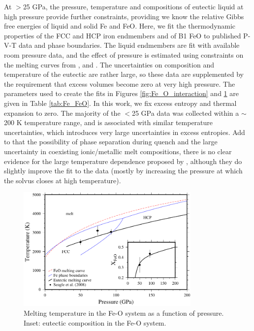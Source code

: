 \documentclass[review]{elsarticle}
\begin{document}
At $>$25 GPa, the pressure, temperature and compositions of eutectic liquid at high pressure \citep{SHCPW2008} provide further constraints, providing we know the relative Gibbs free energies of liquid and solid Fe and FeO. Here, we fit the thermodynamic properties of the FCC and HCP iron endmembers and of B1 FeO to published P-V-T data and phase boundaries. The liquid endmembers are fit with available room pressure data, and the effect of pressure is estimated using constraints on the melting curves from \cite{ADMLM2013}, \cite{SHCPW2008} and \cite{OTHOH2011}. The uncertainties on composition and temperature of the eutectic are rather large, so these data are supplemented by the requirement that excess volumes become zero at very high pressure. The parameters used to create the fits in Figures \ref{fig:Fe_O_interaction} and \ref{fig:Fe_O_melting} are given in Table \ref{tab:Fe_FeO}. In this work, we fix excess entropy and thermal expansion to zero. The majority of the $<$25 GPa data was collected within a $\sim$200 K temperature range, and is associated with similar temperature uncertainties, which introduces very large uncertainties in excess entropies. Add to that the possibility of phase separation during quench and the large uncertainty in coexisting ionic/metallic melt compositions, there is no clear evidence for the large temperature dependence proposed by \cite{Frostetal2010}, although they do slightly improve the fit to the data (mostly by increasing the pressure at which the solvus closes at high temperature).

\begin{figure}[ht!]
  \centering
  \includegraphics[width=0.8\textwidth]{figures/Fe_FeO_T_X_eutectic}
  \caption{Melting temperature in the Fe-O system as a function of pressure. Inset: eutectic composition in the Fe-O system.}
  \label{fig:Fe_O_melting}
\end{figure}
\end{document}
